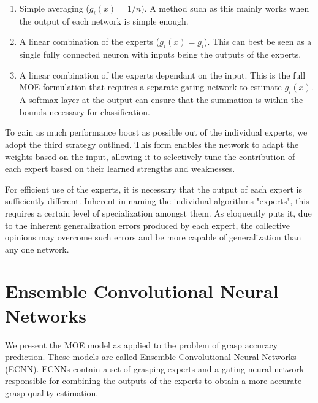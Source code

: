 \documentclass[letterpaper, 10 pt, conference]{ieeeconf}
\begin{document}
\begin{enumerate}[leftmargin=*]
    \item Simple averaging (${g_i(x)=1/n}$).  A method such as this mainly works when the output of each network is simple enough.
    \item A linear combination of the experts ($g_i(x)=g_i$).  This can best be seen as a single fully connected neuron with inputs being the outputs of the experts.
    \item A linear combination of the experts dependant on the input.  This is the full MOE formulation that requires a separate gating network to estimate $g_i(x)$.  A softmax layer at the output can ensure that the summation is within the bounds necessary for classification.
\end{enumerate}


To gain as much performance boost as possible out of the individual experts, we adopt the third strategy outlined. This form enables the network to adapt the weights based on the input, allowing it to selectively tune the contribution of each expert based on their learned strengths and weaknesses.

For efficient use of the experts, it is necessary that the output of each expert is sufficiently different. Inherent in naming the individual algorithms "experts", this requires a certain level of specialization amongst them.  As \cite{ensembleDiversity} eloquently puts it, due to the inherent generalization errors produced by each expert, the collective opinions may overcome such errors and be more capable of generalization than any one network.

\section{Ensemble Convolutional Neural Networks}
\label{sec:moe_grasping}

We present the MOE model as applied to the problem of grasp accuracy prediction.  These models are called Ensemble Convolutional Neural Networks (ECNN).  ECNNs contain a set of grasping experts and a gating neural network responsible for combining the outputs of the experts to obtain a more accurate grasp quality estimation.
\end{document}
